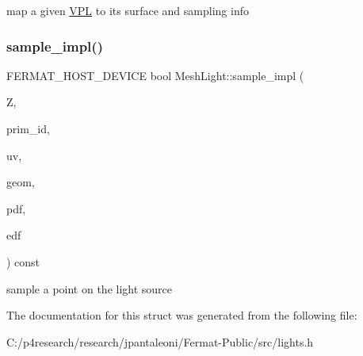 map a given \hyperlink{struct_v_p_l}{V\+PL} to its surface and sampling info \mbox{\label{struct_mesh_light_a41958f4c2147ad55bb95ca8ba90ec39b}} 
\subsubsection{\texorpdfstring{sample\+\_\+impl()}{sample\_impl()}}
{\footnotesize\ttfamily F\+E\+R\+M\+A\+T\+\_\+\+H\+O\+S\+T\+\_\+\+D\+E\+V\+I\+CE bool Mesh\+Light\+::sample\+\_\+impl (\begin{DoxyParamCaption}\item[{const float $\ast$}]{Z,  }\item[{uint32\+\_\+t $\ast$}]{prim\+\_\+id,  }\item[{\hyperlink{structcugar_1_1_vector}{cugar\+::\+Vector2f} $\ast$}]{uv,  }\item[{\hyperlink{struct_vertex_geometry}{Vertex\+Geometry} $\ast$}]{geom,  }\item[{float $\ast$}]{pdf,  }\item[{\hyperlink{struct_edf}{Edf} $\ast$}]{edf }\end{DoxyParamCaption}) const\hspace{0.3cm}{\ttfamily [inline]}}

sample a point on the light source 

The documentation for this struct was generated from the following file\+:\begin{DoxyCompactItemize}
\item 
C\+:/p4research/research/jpantaleoni/\+Fermat-\/\+Public/src/lights.\+h\end{DoxyCompactItemize}
